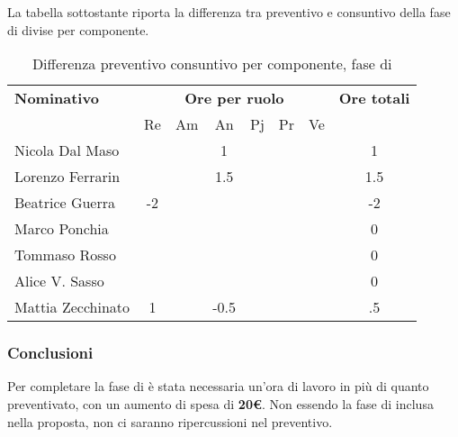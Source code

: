 La tabella sottostante riporta la differenza tra preventivo e consuntivo della fase di \AR{} divise per componente.
\begin{table}[H]
	\centering
	\begin{tabular}{|l|c|c|c|c|c|c|c|}
		\hline
		\textbf{Nominativo} & 
		\multicolumn{6}{c|}{\textbf{Ore per ruolo}} & 
		\textbf{Ore totali} \\
		& Re & Am & An & Pj & Pr & Ve & \\
		\hline
		Nicola Dal Maso & & &1 & & & & 1 \\
		Lorenzo Ferrarin & & &1.5 & & & & 1.5 \\
		Beatrice Guerra & -2 & & & & & & -2 \\
		Marco Ponchia & & & & & & & 0 \\
		Tommaso Rosso & & & & & & & 0 \\
		Alice V. Sasso & & & & & & & 0 \\
		Mattia Zecchinato & 1& &-0.5 & & & & .5  \\
		\hline
	\end{tabular}
	\caption{Differenza preventivo consuntivo per componente, fase di \AR}
\end{table}
\subsubsection{Conclusioni}
Per completare la fase di \AR{} è stata necessaria un'ora di lavoro in più di quanto preventivato, con un aumento di spesa di \textbf{20€}. Non essendo la fase di \AR{} inclusa nella proposta, non ci saranno ripercussioni nel preventivo.

